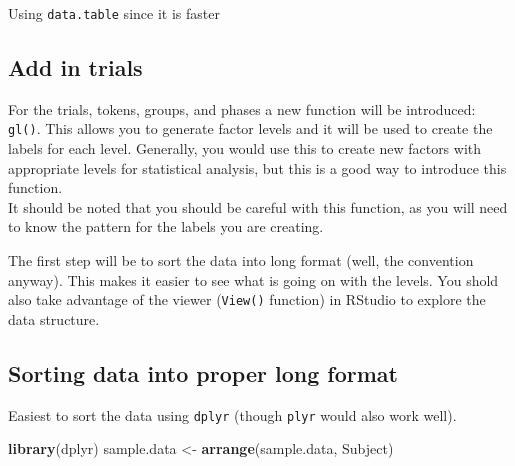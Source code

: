 \documentclass[]{article}
\newenvironment{Shaded}{\begin{snugshade}}{\end{snugshade}}
\newcommand{\KeywordTok}[1]{\textcolor[rgb]{0.13,0.29,0.53}{\textbf{{#1}}}}
\newcommand{\DataTypeTok}[1]{\textcolor[rgb]{0.13,0.29,0.53}{{#1}}}
\newcommand{\StringTok}[1]{\textcolor[rgb]{0.31,0.60,0.02}{{#1}}}
\newcommand{\NormalTok}[1]{{#1}}
\begin{document}
Using \texttt{data.table} since it is faster

\begin{Shaded}
\end{Shaded}

\subsection{Add in trials}\label{add-in-trials}

For the trials, tokens, groups, and phases a new function will be
introduced: \texttt{gl()}. This allows you to generate factor levels and
it will be used to create the labels for each level. Generally, you
would use this to create new factors with appropriate levels for
statistical analysis, but this is a good way to introduce this
function.\\It should be noted that you should be careful with this
function, as you will need to know the pattern for the labels you are
creating.

The first step will be to sort the data into long format (well, the
convention anyway). This makes it easier to see what is going on with
the levels. You shold also take advantage of the viewer (\texttt{View()}
function) in RStudio to explore the data structure.

\subsection{Sorting data into proper long
format}\label{sorting-data-into-proper-long-format}

Easiest to sort the data using \texttt{dplyr} (though \texttt{plyr}
would also work well).

\begin{Shaded}
\begin{Highlighting}[]
\KeywordTok{library}\NormalTok{(dplyr)}
\NormalTok{sample.data <-}\StringTok{ }\KeywordTok{arrange}\NormalTok{(sample.data, Subject)}
\end{Highlighting}
\end{Shaded}
\end{document}
